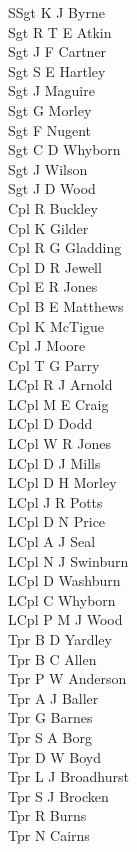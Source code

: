 \begin{multicols}{3}
  \small
  \noindent
  SSgt K J Byrne \\
  Sgt R T E Atkin \\
  Sgt J F Cartner \\
  Sgt S E Hartley \\
  Sgt J Maguire \\
  Sgt G Morley \\
  Sgt F Nugent \\
  Sgt C D Whyborn \\
  Sgt J Wilson \\
  Sgt J D Wood \\
  Cpl R Buckley \\
  Cpl K Gilder \\
  Cpl R G Gladding \\
  Cpl D R Jewell \\
  Cpl E R Jones \\
  Cpl B E Matthews \\
  Cpl K McTigue \\
  Cpl J Moore \\
  Cpl T G Parry \\
  LCpl R J Arnold \\
  LCpl M E Craig \\
  LCpl D Dodd \\
  LCpl W R Jones \\
  LCpl D J Mills \\
  LCpl D H Morley \\
  LCpl J R Potts \\
  LCpl D N Price \\
  LCpl A J Seal \\
  LCpl N J Swinburn \\
  LCpl D Washburn \\
  LCpl C Whyborn \\
  LCpl P M J Wood \\
  Tpr B D Yardley \\
  Tpr B C Allen \\
  Tpr P W Anderson \\
  Tpr A J Baller \\
  Tpr G Barnes \\
  Tpr S A Borg \\
  Tpr D W Boyd \\
  Tpr L J Broadhurst \\
  Tpr S J Brocken \\
  Tpr R Burns \\
  Tpr N Cairns \\

\end{multicols}
